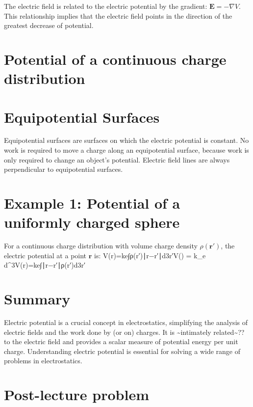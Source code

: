 \documentclass[
  letterpaper,
  DIV=11,
  numbers=noendperiod]{scrreprt}
\begin{document}
The electric field is related to the electric potential by the gradient:
\(\mathrm{\mathbf{E}}= -\nabla V\). This relationship implies that the
electric field points in the direction of the greatest decrease of
potential.

\section{Potential of a continuous charge
distribution}\label{potential-of-a-continuous-charge-distribution}

\section{Equipotential Surfaces}\label{equipotential-surfaces}

Equipotential surfaces are surfaces on which the electric potential is
constant. No work is required to move a charge along an equipotential
surface, because work is only required to change an object's potential.
Electric field lines are always perpendicular to equipotential surfaces.

\section{Example 1: Potential of a uniformly charged
sphere}\label{example-1-potential-of-a-uniformly-charged-sphere}

For a continuous charge distribution with volume charge density
\(\rho(\mathrm{\mathbf{r}}')\), the electric potential at a point
\(\mathbf{r}\) is: V(r)=ke∫ρ(r′)∣r−r′∣d3r′V() = k\_e
\int {}
d\^{}3V(r)=ke∫∣r−r′∣ρ(r′)d3r′

\section{Summary}\label{summary-1}

Electric potential is a crucial concept in electrostatics, simplifying
the analysis of electric fields and the work done by (or on) charges. It
is \textasciitilde intimately related\textasciitilde?? to the electric
field and provides a scalar measure of potential energy per unit charge.
Understanding electric potential is essential for solving a wide range
of problems in electrostatics.

\section{Post-lecture problem}\label{post-lecture-problem-1}
\end{document}
